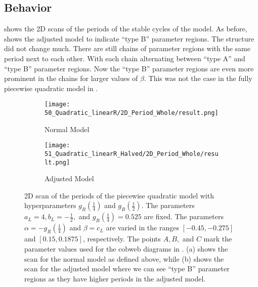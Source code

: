 \subsection{Behavior}
\label{sec:setup.quad.hybrid.behavior}

 shows the 2D scans of the periods of the stable cycles of the model.
As before,  shows the adjusted model to indicate ``type B'' parameter regions.
The structure did not change much.
There are still chains of parameter regions with the same period next to each other.
With each chain alternating between ``type A'' and ``type B'' parameter regions.
Now the ``type B'' parameter regions are even more prominent in the chains for larger values of $\beta$.
This was not the case in the fully piecewise quadratic model in .

\begin{figure}
	\centering
	\begin{subfigure}{0.4\textwidth}
		\centering
		\texttt{[image: 50\_Quadratic\_linearR/2D\_Period\_Whole/result.png]}
		\caption{Normal Model}
		\label{fig:setup.quad.hybrid.period.full}
	\end{subfigure}
	\begin{subfigure}{0.4\textwidth}
		\centering
		\texttt{[image: 51\_Quadratic\_linearR\_Halved/2D\_Period\_Whole/result.png]}
		\caption{Adjusted Model}
		\label{fig:setup.quad.hybrid.period.halved}
	\end{subfigure}
	\caption[2D scan of the periods of the piecewise hybrid quadratic model with hyperparameters]{
		2D scan of the periods of the piecewise quadratic model with hyperparameters $g_R\left(\frac{1}{4}\right)$ and $g_R\left(\frac{1}{2}\right)$.
		The parameters $a_L = 4, b_L = -\frac{1}{2},$ and $g_R\left(\frac{1}{4}\right) = 0.525$ are fixed.
		The parameters $\alpha = -g_R\left(\frac{1}{4}\right)$ and $\beta = c_L$ are varied in the ranges $[-0.45, -0.275]$ and $[0.15, 0.1875]$, respectively.
		The points $A, B,$ and $C$ mark the parameter values used for the cobweb diagrams in .
		(a) shows the scan for the normal model as defined above, while (b) shows the scan for the adjusted model where we can see ``type B'' parameter regions as they have higher periods in the adjusted model.
	}
	\label{fig:setup.quad.hybrid.period}
\end{figure}

